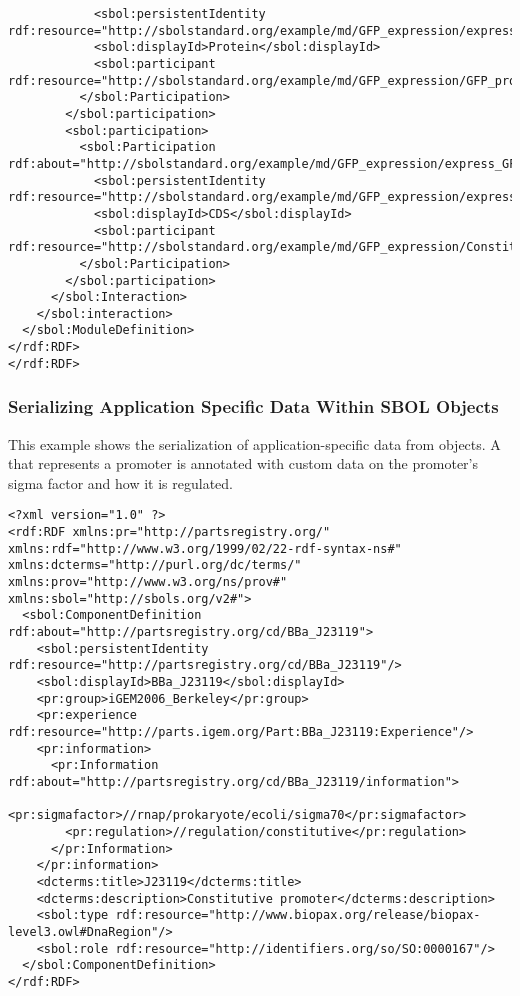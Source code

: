 \begin{lstlisting}
            <sbol:persistentIdentity rdf:resource="http://sbolstandard.org/example/md/GFP_expression/express_GFP/Protein"/>
            <sbol:displayId>Protein</sbol:displayId>
            <sbol:participant rdf:resource="http://sbolstandard.org/example/md/GFP_expression/GFP_protein"/>
          </sbol:Participation>
        </sbol:participation>
        <sbol:participation>
          <sbol:Participation rdf:about="http://sbolstandard.org/example/md/GFP_expression/express_GFP/CDS">
            <sbol:persistentIdentity rdf:resource="http://sbolstandard.org/example/md/GFP_expression/express_GFP/CDS"/>
            <sbol:displayId>CDS</sbol:displayId>
            <sbol:participant rdf:resource="http://sbolstandard.org/example/md/GFP_expression/Constitutive_GFP"/>
          </sbol:Participation>
        </sbol:participation>
      </sbol:Interaction>
    </sbol:interaction>
  </sbol:ModuleDefinition>
</rdf:RDF>
</rdf:RDF>
\end{lstlisting}

\subsubsection{Serializing Application Specific Data Within SBOL Objects}
This example shows the serialization of application-specific data from  objects. A\\
 that represents a promoter is annotated with custom data on the promoter's sigma factor and how it is regulated.
\begin{lstlisting}
<?xml version="1.0" ?>
<rdf:RDF xmlns:pr="http://partsregistry.org/" xmlns:rdf="http://www.w3.org/1999/02/22-rdf-syntax-ns#" xmlns:dcterms="http://purl.org/dc/terms/" xmlns:prov="http://www.w3.org/ns/prov#" xmlns:sbol="http://sbols.org/v2#">
  <sbol:ComponentDefinition rdf:about="http://partsregistry.org/cd/BBa_J23119">
    <sbol:persistentIdentity rdf:resource="http://partsregistry.org/cd/BBa_J23119"/>
    <sbol:displayId>BBa_J23119</sbol:displayId>
    <pr:group>iGEM2006_Berkeley</pr:group>
    <pr:experience rdf:resource="http://parts.igem.org/Part:BBa_J23119:Experience"/>
    <pr:information>
      <pr:Information rdf:about="http://partsregistry.org/cd/BBa_J23119/information">
        <pr:sigmafactor>//rnap/prokaryote/ecoli/sigma70</pr:sigmafactor>
        <pr:regulation>//regulation/constitutive</pr:regulation>
      </pr:Information>
    </pr:information>
    <dcterms:title>J23119</dcterms:title>
    <dcterms:description>Constitutive promoter</dcterms:description>
    <sbol:type rdf:resource="http://www.biopax.org/release/biopax-level3.owl#DnaRegion"/>
    <sbol:role rdf:resource="http://identifiers.org/so/SO:0000167"/>
  </sbol:ComponentDefinition>
</rdf:RDF>
\end{lstlisting}

